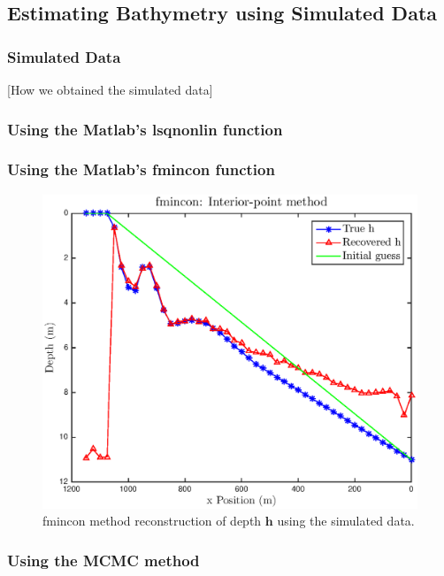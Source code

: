 \subsection{Estimating Bathymetry using Simulated Data}

\subsubsection{Simulated Data}

[How we obtained the simulated data]

\subsubsection{Using the Matlab's lsqnonlin function }


\subsubsection{Using the Matlab's fmincon function }
\begin{figure}[H]
\center
\includegraphics[scale=0.6]{img/fmincon_simulated_results_plot20FINAL.eps} 
\caption{fmincon method reconstruction of depth $\mathbf{h}$ using the simulated data.}
\label{fmincon_simulated}
\end{figure}



\subsubsection{Using the MCMC method }